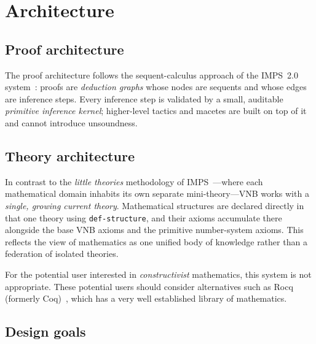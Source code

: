 \section{Architecture}
\label{sec:architecture}

\subsection{Proof architecture}

\begin{sloppypar}
The proof architecture follows the sequent-calculus approach of the
IMPS~2.0 system~\cite{IMPS}: proofs are \emph{deduction graphs} whose
nodes are sequents and whose edges are inference steps.  Every inference
step is validated by a small, auditable \emph{primitive inference kernel};
higher-level tactics and macetes are built on top of it and cannot
introduce unsoundness.
\end{sloppypar}

\subsection{Theory architecture}

In contrast to the \emph{little theories} methodology of
IMPS~\cite{IMPS}---where each mathematical domain inhabits its own
separate mini-theory---VNB works with a \emph{single, growing current
theory}.  Mathematical structures are declared directly in that one theory
using \texttt{def-structure}, and their axioms accumulate there alongside
the base VNB axioms and the primitive number-system axioms.  This reflects
the view of mathematics as one unified body of knowledge rather than a
federation of isolated theories.

\begin{remark}\label{remark:27137-61828-986360}
%
For the potential user interested in \emph{constructivist} mathematics,
this system is not appropriate. These potential users should consider
alternatives such as Rocq (formerly Coq)~\cite{Rocq}, which has a very well established library of
mathematics.
%
\end{remark}

\subsection{Design goals}

